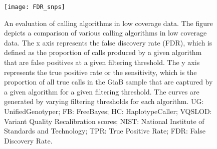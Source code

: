 \begin{figure}[!htbp]
\centering
        \texttt{[image: FDR\_snps]}
\caption[\gls{ROC} curves for \glspl{SNP} using different variant callers.]{An evaluation of calling algorithms in low coverage data. The figure depicts a comparison of various calling algorithms in low coverage data. The x axis represents the false discovery rate (FDR), which is defined as the proportion of calls produced by a given algorithm that are false positives at a given filtering threshold. The y axis represents the true positive rate or the sensitivity, which is the proportion of all true calls in the GiaB sample that are captured by a given algorithm for a given filtering threshold. The curves are generated by varying filtering thresholds for each algorithm. UG: UnifiedGenotyper; FB: FreeBayes; HC: HaplotypeCaller;
VQSLOD: Variant Quality Recalibration scores; NIST: National Institute of Standards and Technology; TPR: True Positive Rate; FDR: False Discovery Rate.}
\label{fig:roc}
\end{figure}


%